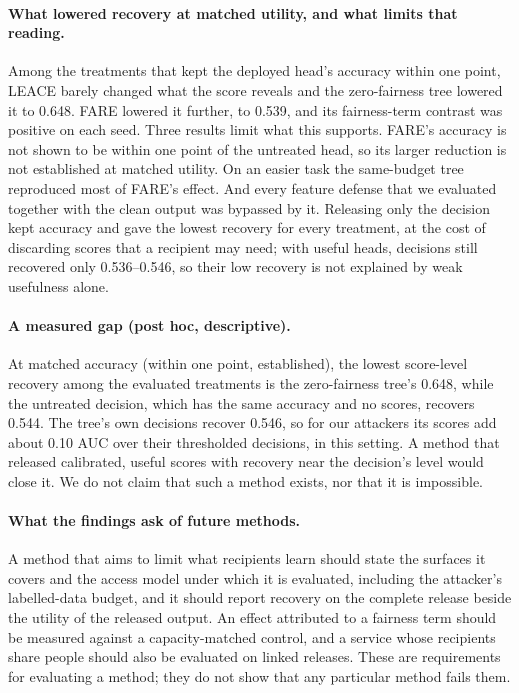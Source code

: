 \documentclass[10pt]{article}
\begin{document}
\paragraph{What lowered recovery at matched utility, and what limits that reading.} Among the treatments that kept the
deployed head's accuracy within one point, LEACE barely changed what the score reveals and the zero-fairness tree
lowered it to 0.648. FARE lowered it further, to 0.539, and its fairness-term contrast was positive on each seed. Three
results limit what this supports. FARE's accuracy is not shown to be within one point of the untreated head, so its
larger reduction is not established at matched utility. On an easier task the same-budget tree reproduced most of
FARE's effect. And every feature defense that we evaluated together with the clean output was bypassed by it.
Releasing only the decision kept accuracy and gave the lowest recovery for every treatment, at the cost of discarding
scores that a recipient may need; with useful heads, decisions still recovered only 0.536--0.546, so their low recovery
is not explained by weak usefulness alone.

\paragraph{A measured gap (post hoc, descriptive).} At matched accuracy (within one point, established), the lowest
score-level recovery among the evaluated treatments is the zero-fairness tree's 0.648, while the untreated decision,
which has the same accuracy and no scores, recovers 0.544. The tree's own decisions recover 0.546, so for our attackers its scores add about 0.10 AUC over their thresholded
decisions, in this setting. A method that released calibrated, useful scores with recovery near the decision's level would close it. We do
not claim that such a method exists, nor that it is impossible.

\paragraph{What the findings ask of future methods.} A method that aims to limit what recipients learn should state the
surfaces it covers and the access model under which it is evaluated, including the attacker's labelled-data budget, and
it should report recovery on the complete release beside the utility of the released output. An effect attributed to a
fairness term should be measured against a capacity-matched control, and a service whose recipients share people should
also be evaluated on linked releases. These are requirements for evaluating a method; they do not show that any
particular method fails them.
\end{document}
